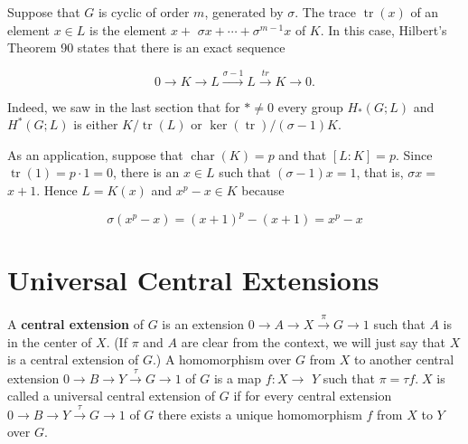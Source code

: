 \begin{example}
Suppose that $G$ is cyclic of order $m$, generated by $\sigma$. The trace $\operatorname{tr}(x)$ of an element $x \in L$ is the element $x+$ $\sigma x+\cdots+\sigma^{m-1} x$ of $K$. In this case, Hilbert's Theorem 90 states that there is an exact sequence

    $$
    0 \rightarrow K \rightarrow L \xrightarrow{\sigma-1} L \xrightarrow{t r} K \rightarrow 0 .
    $$
    
    
    Indeed, we saw in the last section that for $* \neq 0$ every group $H_*(G ; L)$ and $H^*(G ; L)$ is either $K / \operatorname{tr}(L)$ or $\operatorname{ker}(\operatorname{tr}) /(\sigma-1) K$.
    
    As an application, suppose that $\operatorname{char}(K)=p$ and that $[L: K]=p$. Since $\operatorname{tr}(1)=p \cdot 1=0$, there is an $x \in L$ such that $(\sigma-1) x=1$, that is, $\sigma x=$ $x+1$. Hence $L=K(x)$ and $x^p-x \in K$ because
    
    $$
    \sigma\left(x^p-x\right)=(x+1)^p-(x+1)=x^p-x
    $$
\end{example}




\section{Universal Central Extensions}

A \textbf{central extension} of $G$ is an extension $0 \rightarrow A \rightarrow X \xrightarrow{\pi} G \rightarrow 1$ such that $A$ is in the center of $X$. (If $\pi$ and $A$ are clear from the context, we will just say that $X$ is a central extension of $G$.) A homomorphism over $G$ from $X$ to another central extension $0 \rightarrow B \rightarrow Y \xrightarrow{\tau} G \rightarrow 1$ of $G$ is a map $f: X \rightarrow$ $Y$ such that $\pi=\tau f .\; X$ is called a universal central extension of $G$ if for every central extension $0 \rightarrow B \rightarrow Y \xrightarrow{\tau} G \rightarrow 1$ of $G$ there exists a unique homomorphism $f$ from $X$ to $Y$ over $G$.

